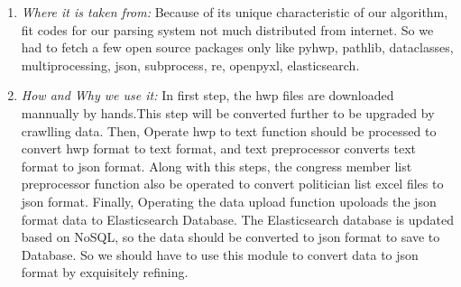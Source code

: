 \documentclass[conference]{IEEEtran}
\begin{document}
\begin{enumerate}
\begin{enumerate}
		 \end{enumerate}

		  
	    \item \textit{Where it is taken from: } Because of its unique characteristic of our algorithm, fit codes for our parsing system not much distributed from internet. So we had to fetch a few open source packages only like pyhwp, pathlib, dataclasses, multiprocessing, json, subprocess, re, openpyxl, elasticsearch.\\
	    
  \item \textit{How and Why we use it: } In first step, the hwp files are downloaded mannually by hands.This step will be converted further to be upgraded by crawlling data. Then, Operate hwp to text function should be processed to convert hwp format to text format, and text preprocessor converts text format to json format. Along with this steps, the congress member list preprocessor function also be operated to convert politician list excel files to json format. Finally, Operating the data upload function upoloads the json format data to Elasticsearch Database. The Elasticsearch database is updated based on NoSQL, so the data should be converted to json format to save to Database. So we should have to use this module to convert data to json format by exquisitely refining.\\
  \end{enumerate}
  
  
  
\end{document}
